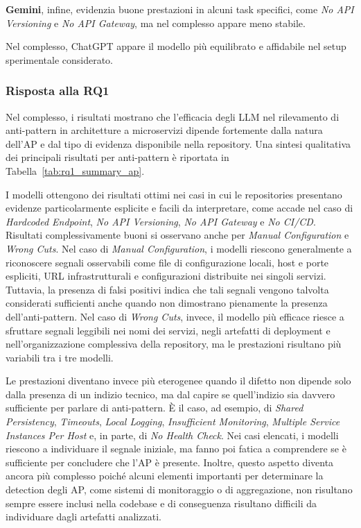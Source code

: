 \textbf{Gemini}, infine, evidenzia buone prestazioni in alcuni task specifici, come \textit{No API Versioning} e \textit{No API Gateway}, ma nel complesso appare meno stabile. 

Nel complesso, ChatGPT appare il modello più equilibrato e affidabile nel setup sperimentale considerato.

\subsubsection*{Risposta alla RQ1}
Nel complesso, i risultati mostrano che l’efficacia degli LLM nel rilevamento di anti-pattern in architetture a microservizi dipende fortemente dalla natura dell'AP e dal tipo di evidenza disponibile nella repository. Una sintesi qualitativa dei principali risultati per anti-pattern è riportata in Tabella~\ref{tab:rq1_summary_ap}.

I modelli ottengono dei risultati ottimi nei casi in cui le repositories presentano evidenze particolarmente esplicite e facili da interpretare, come accade nel caso di \textit{Hardcoded Endpoint}, \textit{No API Versioning}, \textit{No API Gateway} e \textit{No CI/CD}.
Risultati complessivamente buoni si osservano anche per \textit{Manual Configuration} e \textit{Wrong Cuts}. Nel caso di \textit{Manual Configuration}, i modelli riescono generalmente a riconoscere segnali osservabili come file di configurazione locali, host e porte espliciti, URL infrastrutturali e configurazioni distribuite nei singoli servizi. Tuttavia, la presenza di falsi positivi indica che tali segnali vengono talvolta considerati sufficienti anche quando non dimostrano pienamente la presenza dell’anti-pattern. Nel caso di \textit{Wrong Cuts}, invece, il modello più efficace riesce a sfruttare segnali leggibili nei nomi dei servizi, negli artefatti di deployment e nell’organizzazione complessiva della repository, ma le prestazioni risultano più variabili tra i tre modelli.

Le prestazioni diventano invece più eterogenee quando il difetto non dipende solo dalla presenza di un indizio tecnico, ma dal capire se quell’indizio sia davvero sufficiente per parlare di anti-pattern. È il caso, ad esempio, di \textit{Shared Persistency}, \textit{Timeouts}, \textit{Local Logging}, \textit{Insufficient Monitoring}, \textit{Multiple Service Instances Per Host} e, in parte, di \textit{No Health Check}. 
Nei casi elencati, i modelli riescono a individuare il segnale iniziale, ma fanno poi fatica a comprendere se è sufficiente per concludere che l'AP è presente. Inoltre, questo aspetto diventa ancora più complesso poiché alcuni elementi importanti per determinare la detection degli AP, come sistemi di monitoraggio o di aggregazione, non risultano sempre essere inclusi nella codebase e di conseguenza risultano difficili da individuare dagli artefatti analizzati.

